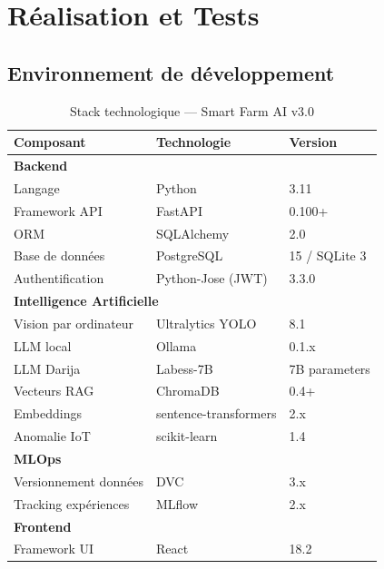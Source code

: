 \chapter{Réalisation et Tests}
\thispagestyle{fancy}

\section{Environnement de développement}

\begin{table}[H]
\centering
\caption{Stack technologique — Smart Farm AI v3.0}
\label{tab:stack}
\begin{tabular}{lll}
\toprule
\textbf{Composant} & \textbf{Technologie} & \textbf{Version} \\
\midrule
\multicolumn{3}{l}{\textbf{Backend}} \\
Langage                  & Python            & 3.11 \\
Framework API            & FastAPI           & 0.100+ \\
ORM                      & SQLAlchemy        & 2.0 \\
Base de données          & PostgreSQL        & 15 / SQLite 3 \\
Authentification         & Python-Jose (JWT) & 3.3.0 \\
\midrule
\multicolumn{3}{l}{\textbf{Intelligence Artificielle}} \\
Vision par ordinateur    & Ultralytics YOLO  & 8.1 \\
LLM local                & Ollama            & 0.1.x \\
LLM Darija               & Labess-7B         & 7B parameters \\
Vecteurs RAG             & ChromaDB          & 0.4+ \\
Embeddings               & sentence-transformers & 2.x \\
Anomalie IoT             & scikit-learn      & 1.4 \\
\midrule
\multicolumn{3}{l}{\textbf{MLOps}} \\
Versionnement données    & DVC               & 3.x \\
Tracking expériences     & MLflow            & 2.x \\
\midrule
\multicolumn{3}{l}{\textbf{Frontend}} \\
Framework UI             & React             & 18.2 \\

\end{tabular}
\end{table}
